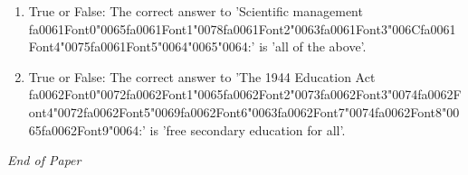 \documentclass[12pt]{article}
\begin{document}
\begin{enumerate}[label=\arabic*.]
\item True or False: The correct answer to 'Scientific management {\csname fa0061Font0\endcsname\char"0065}{\csname fa0061Font1\endcsname\char"0078}{\csname fa0061Font2\endcsname\char"0063}{\csname fa0061Font3\endcsname\char"006C}{\csname fa0061Font4\endcsname\char"0075}{\csname fa0061Font5\endcsname\char"0064}{\char"0065}{\char"0064}:' is 'all of the above'.
\item True or False: The correct answer to 'The 1944 Education Act {\csname fa0062Font0\endcsname\char"0072}{\csname fa0062Font1\endcsname\char"0065}{\csname fa0062Font2\endcsname\char"0073}{\csname fa0062Font3\endcsname\char"0074}{\csname fa0062Font4\endcsname\char"0072}{\csname fa0062Font5\endcsname\char"0069}{\csname fa0062Font6\endcsname\char"0063}{\csname fa0062Font7\endcsname\char"0074}{\csname fa0062Font8\endcsname\char"0065}{\csname fa0062Font9\endcsname\char"0064}:' is 'free secondary education for all'.
\end{enumerate}

\vfill
\noindent\textit{End of Paper}
\end{document}
